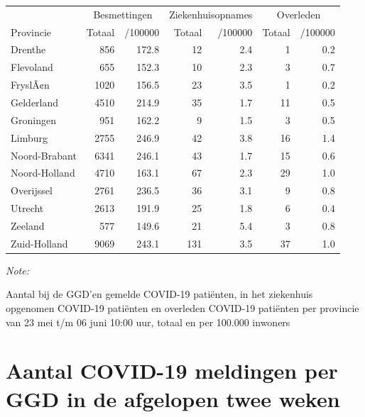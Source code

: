 \documentclass[
  english,
  man,floatsintext]{apa6}
\begin{document}
\begin{table}
\centering
\begin{threeparttable}
\begin{tabular}{lrrrrrr}
\toprule
\multicolumn{1}{c}{ } & \multicolumn{2}{c}{Besmettingen} & \multicolumn{2}{c}{Ziekenhuisopnames} & \multicolumn{2}{c}{Overleden} \\
\cmidrule(l{3pt}r{3pt}){2-3} \cmidrule(l{3pt}r{3pt}){4-5} \cmidrule(l{3pt}r{3pt}){6-7}
Provincie & Totaal & /100000 & Totaal & /100000 & Totaal & /100000\\
\midrule
Drenthe & 856 & 172.8 & 12 & 2.4 & 1 & 0.2\\
Flevoland & 655 & 152.3 & 10 & 2.3 & 3 & 0.7\\
FryslÃ¢n & 1020 & 156.5 & 23 & 3.5 & 1 & 0.2\\
Gelderland & 4510 & 214.9 & 35 & 1.7 & 11 & 0.5\\
Groningen & 951 & 162.2 & 9 & 1.5 & 3 & 0.5\\
Limburg & 2755 & 246.9 & 42 & 3.8 & 16 & 1.4\\
Noord-Brabant & 6341 & 246.1 & 43 & 1.7 & 15 & 0.6\\
Noord-Holland & 4710 & 163.1 & 67 & 2.3 & 29 & 1.0\\
Overijssel & 2761 & 236.5 & 36 & 3.1 & 9 & 0.8\\
Utrecht & 2613 & 191.9 & 25 & 1.8 & 6 & 0.4\\
Zeeland & 577 & 149.6 & 21 & 5.4 & 3 & 0.8\\
Zuid-Holland & 9069 & 243.1 & 131 & 3.5 & 37 & 1.0\\
\bottomrule
\end{tabular}
\begin{tablenotes}
\item \textit{Note: } 
\item Aantal bij de GGD’en gemelde COVID-19 patiënten, in het ziekenhuis opgenomen COVID-19 patiënten en overleden COVID-19 patiënten per provincie van 23 mei t/m 06 juni 10:00 uur, totaal en per 100.000 inwoners
\end{tablenotes}
\end{threeparttable}
\end{table}

\newpage

\hypertarget{aantal-covid-19-meldingen-per-ggd-in-de-afgelopen-twee-weken}{%
\section{Aantal COVID-19 meldingen per GGD in de afgelopen twee weken}\label{aantal-covid-19-meldingen-per-ggd-in-de-afgelopen-twee-weken}}
\end{document}
